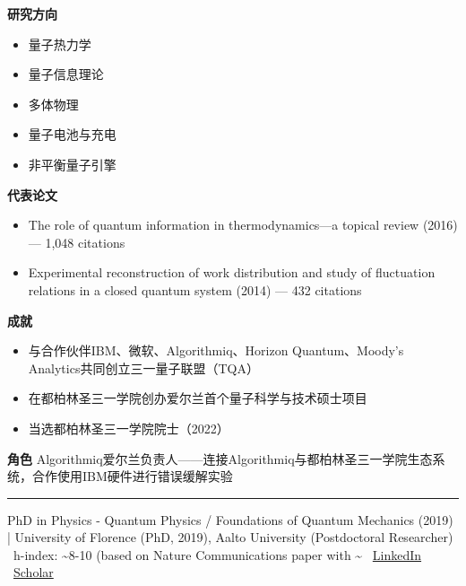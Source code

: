 \par{\footnotesize\color{mainred}\textbf{研究方向}}
\begin{itemize}[leftmargin=1.2em,itemsep=0pt,topsep=0pt]
\item {\footnotesize 量子热力学}
\item {\footnotesize 量子信息理论}
\item {\footnotesize 多体物理}
\item {\footnotesize 量子电池与充电}
\item {\footnotesize 非平衡量子引擎}
\end{itemize}
\par{\footnotesize\color{mainred}\textbf{代表论文}}
\begin{itemize}[leftmargin=1.2em,itemsep=0pt,topsep=0pt]
\item {\footnotesize The role of quantum information in thermodynamics—a topical review (2016) — 1,048 citations}
\item {\footnotesize Experimental reconstruction of work distribution and study of fluctuation relations in a closed quantum system (2014) — 432 citations}
\end{itemize}
\par{\footnotesize\color{mainred}\textbf{成就}}
\begin{itemize}[leftmargin=1.2em,itemsep=0pt,topsep=0pt]
\item {\footnotesize 与合作伙伴IBM、微软、Algorithmiq、Horizon Quantum、Moody's Analytics共同创立三一量子联盟（TQA）}
\item {\footnotesize 在都柏林圣三一学院创办爱尔兰首个量子科学与技术硕士项目}
\item {\footnotesize 当选都柏林圣三一学院院士（2022）}
\end{itemize}
\par{\footnotesize\color{mainred}\textbf{角色}} {\footnotesize Algorithmiq爱尔兰负责人——连接Algorithmiq与都柏林圣三一学院生态系统，合作使用IBM硬件进行错误缓解实验}
\vspace{2pt}\hrule\vspace{2pt}
\vspace{4pt}
\par{\footnotesize\color{graytext}PhD in Physics - Quantum Physics / Foundations of Quantum Mechanics (2019) | University of Florence (PhD, 2019), Aalto University (Postdoctoral Researcher) \textbar\  h-index: \textasciitilde{}8-10 (based on Nature Communications paper with \textasciitilde{} \textbar\  \href{https://www.linkedin.com/in/caterina-foti/}{LinkedIn} \textbar\  \href{https://orcid.org/0000-0002-3977-4295}{Scholar}}
